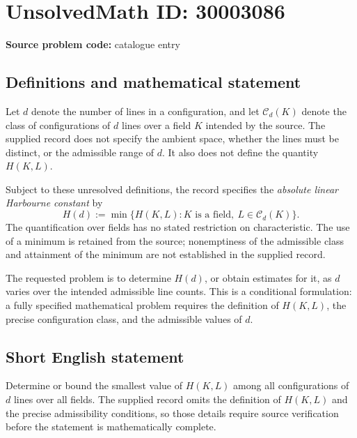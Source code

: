 \documentclass[11pt]{article}
\begin{document}
\section*{UnsolvedMath ID: 30003086}
\textbf{Source problem code:} catalogue entry
\subsection{Definitions and mathematical statement}
Let \(d\) denote the number of lines in a configuration, and let \(\mathcal C_d(K)\) denote the class of configurations of \(d\) lines over a field \(K\) intended by the source. The supplied record does not specify the ambient space, whether the lines must be distinct, or the admissible range of \(d\). It also does not define the quantity \(H(K,L)\).

Subject to these unresolved definitions, the record specifies the \emph{absolute linear Harbourne constant} by
\[
H(d):=\min\bigl\{H(K,L): K\text{ is a field},\ L\in\mathcal C_d(K)\bigr\}.
\]
The quantification over fields has no stated restriction on characteristic. The use of a minimum is retained from the source; nonemptiness of the admissible class and attainment of the minimum are not established in the supplied record.

The requested problem is to determine \(H(d)\), or obtain estimates for it, as \(d\) varies over the intended admissible line counts. This is a conditional formulation: a fully specified mathematical problem requires the definition of \(H(K,L)\), the precise configuration class, and the admissible values of \(d\).
\subsection{Short English statement}
Determine or bound the smallest value of \(H(K,L)\) among all configurations of \(d\) lines over all fields. The supplied record omits the definition of \(H(K,L)\) and the precise admissibility conditions, so those details require source verification before the statement is mathematically complete.
\end{document}
